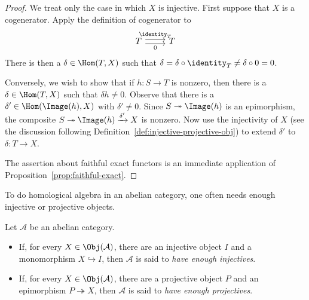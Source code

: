\begin{proof}
We treat only the case in which $X$ is injective. First suppose that $X$ is a
cogenerator. Apply the definition of cogenerator to
\[\begin{tikzcd}
	T \arrow[r, shift left, "{\identity_T}"] \arrow[r, shift right, "0"'] & T
\end{tikzcd}\]
There is then a $\delta\in\Hom(T,X)$ such that
$\delta=\delta\circ\identity_T\neq\delta\circ0=0$.

Conversely, we wish to show that if $h:S\to T$ is nonzero, then there is a
$\delta\in\Hom(T,X)$ such that $\delta h\neq0$. Observe that there is a
$\delta'\in\Hom(\Image(h),X)$ with $\delta'\neq0$. Since
$S\twoheadrightarrow\Image(h)$ is an epimorphism, the composite
$S\twoheadrightarrow\Image(h)\xrightarrow{\delta'}X$ is nonzero. Now use the
injectivity of $X$ (see the discussion following
Definition~\ref{def:injective-projective-obj}) to extend $\delta'$ to
$\delta:T\to X$.

The assertion about faithful exact functors is an immediate application of
Proposition~\ref{prop:faithful-exact}.
\end{proof}

To do homological algebra in an abelian category, one often needs enough
injective or projective objects.

\begin{definition}\label{def:enough-injectives}
Let $\mathcal{A}$ be an abelian category.
\begin{itemize}
	\item If, for every $X\in\Obj(\mathcal{A})$, there are an injective object
	$I$ and a monomorphism $X\hookrightarrow I$, then $\mathcal{A}$ is said to
	\emph{have enough injectives}.
	\item If, for every $X\in\Obj(\mathcal{A})$, there are a projective object
	$P$ and an epimorphism $P\twoheadrightarrow X$, then $\mathcal{A}$ is said
	to \emph{have enough projectives}.
\end{itemize}
\end{definition}

